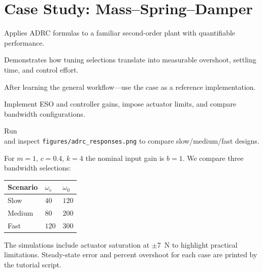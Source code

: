 \section{Case Study: Mass--Spring--Damper}
\begin{beginnerguide}
    \item[\textbf{What?}] Applies ADRC formulas to a familiar second-order plant with quantifiable performance.
    \item[\textbf{Why?}] Demonstrates how tuning selections translate into measurable overshoot, settling time, and control effort.
    \item[\textbf{When?}] After learning the general workflow—use the case as a reference implementation.
    \item[\textbf{How?}] Implement ESO and controller gains, impose actuator limits, and compare bandwidth configurations.
    \item[\textbf{Example}] Run \\and inspect \texttt{figures/adrc\_responses.png} to compare slow/medium/fast designs.
\end{beginnerguide}
For $m=1$, $c=0.4$, $k=4$ the nominal input gain is $b=1$. We compare three bandwidth selections:
\begin{center}
\begin{tabular}{lll}
\toprule
Scenario & $\omega_c$ & $\omega_0$ \\ \midrule
Slow & $40$ & $120$ \\
Medium & $80$ & $200$ \\
Fast & $120$ & $300$ \\
\bottomrule
\end{tabular}
\end{center}
The simulations include actuator saturation at $\pm 7$~N to highlight practical limitations. Steady-state error and percent overshoot for each case are printed by the tutorial script.


